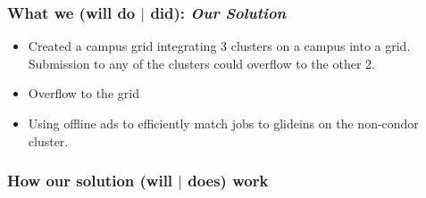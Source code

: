 \documentclass[11pt]{article}
\begin{document}
\subsubsection*{What we (will do $|$ did): {\em Our Solution}}
\begin{itemize}



\item
Created a campus grid integrating 3 clusters on a campus into a grid.  Submission to any of the clusters could overflow to the other 2.

\item
Overflow to the grid

\item
Using offline ads to efficiently match jobs to glideins on the non-condor cluster.

\end{itemize}



\subsubsection*{How our solution (will $|$ does) work}



\end{document}

